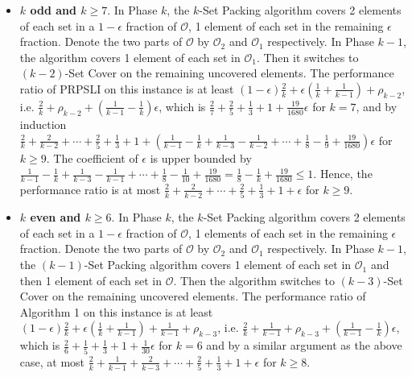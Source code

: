 \documentclass[runningheads,a4paper]{llncs}
\numberwithin{equation}{section}
\begin{document}
\begin{itemize}
    \item \textbf{$k$ odd and $k\geq 7$}. In Phase $k$, the $k$-Set Packing algorithm covers 2 elements of each set in a $1-\epsilon$ fraction of $\mathscr{O}$, 1 element of each set in the remaining $\epsilon$ fraction. Denote the two parts of $\mathscr{O}$ by $\mathscr{O}_2$ and $\mathscr{O}_1$ respectively. In Phase $k-1$, the algorithm covers 1 element of each set in $\mathscr{O}_1$. Then it switches to $(k-2)$-Set Cover on the remaining uncovered elements. The performance ratio of PRPSLI on this instance is at least $(1-\epsilon)\frac{2}{k}+\epsilon(\frac{1}{k}+\frac{1}{k-1})+\rho_{k-2}$, i.e. $\frac{2}{k}+\rho_{k-2}+(\frac{1}{k-1}-\frac{1}{k})\epsilon$, which is $\frac{2}{7}+\frac{2}{5}+\frac{1}{3}+1+\frac{19}{1680}\epsilon$ for $k=7$, and by induction  $\frac{2}{k}+\frac{2}{k-2}+\cdots+\frac{2}{5}+\frac{1}{3}+1+(\frac{1}{k-1}-\frac{1}{k}+\frac{1}{k-3}-\frac{1}{k-2}+\cdots+\frac{1}{8}-\frac{1}{9}+\frac{19}{1680})\epsilon$ for $k\geq 9$. The coefficient of $\epsilon$ is upper bounded by $\frac{1}{k-1}-\frac{1}{k}+\frac{1}{k-3}-\frac{1}{k-1}+\cdots+\frac{1}{8}-\frac{1}{10}+\frac{19}{1680}= \frac{1}{8}-\frac{1}{k}+\frac{19}{1680}\leq 1$. Hence, the performance ratio is at most $\frac{2}{k}+\frac{2}{k-2}+\cdots+\frac{2}{5}+\frac{1}{3}+1+\epsilon$ for $k\geq 9$. \\

    \item \textbf{$k$ even and $k\geq 6$}. In Phase $k$, the $k$-Set Packing algorithm covers 2 elements of each set in a $1-\epsilon$ fraction of $\mathscr{O}$, 1 elements of each set in the remaining $\epsilon$ fraction. Denote the two parts of $\mathscr{O}$ by $\mathscr{O}_2$ and $\mathscr{O}_1$ respectively. In Phase $k-1$, the $(k-1)$-Set Packing algorithm covers 1 element of each set in $\mathscr{O}_1$ and then 1 element of each set in $\mathscr{O}$. Then the algorithm switches to $(k-3)$-Set Cover on the remaining uncovered elements. The performance ratio of Algorithm 1 on this instance is at least $(1-\epsilon)\frac{2}{k}+\epsilon(\frac{1}{k}+\frac{1}{k-1})+\frac{1}{k-1}+\rho_{k-3}$, i.e. $\frac{2}{k}+\frac{1}{k-1}+\rho_{k-3}+(\frac{1}{k-1}-\frac{1}{k})\epsilon$, which is $\frac{2}{6}+\frac{1}{5}+\frac{1}{3}+1+\frac{1}{30}\epsilon$ for $k=6$ and by a similar argument as the above case, at most $\frac{2}{k}+\frac{1}{k-1}+\frac{2}{k-3}+\cdots+\frac{2}{5}+\frac{1}{3}+1+\epsilon$ for $k\geq 8$. \\

\end{itemize}
\end{document}
